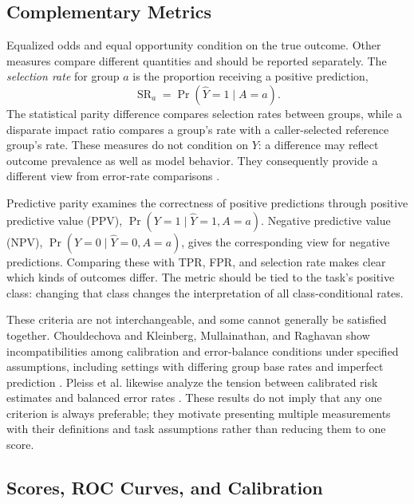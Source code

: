 \documentclass[12pt,a4paper]{article}
\begin{document}
\subsection{Complementary Metrics}

Equalized odds and equal opportunity condition on the true outcome. Other measures compare different quantities and should be reported separately. The \emph{selection rate} for group $a$ is the proportion receiving a positive prediction,
\begin{equation}
    \operatorname{SR}_a=\Pr(\widehat{Y}=1\mid A=a).
    \label{eq:selection-rate}
\end{equation}
The statistical parity difference compares selection rates between groups, while a disparate impact ratio compares a group's rate with a caller-selected reference group's rate. These measures do not condition on $Y$: a difference may reflect outcome prevalence as well as model behavior. They consequently provide a different view from error-rate comparisons \cite{hardt2016,verma2018}.

Predictive parity examines the correctness of positive predictions through positive predictive value (PPV), $\Pr(Y=1\mid\widehat{Y}=1,A=a)$. Negative predictive value (NPV), $\Pr(Y=0\mid\widehat{Y}=0,A=a)$, gives the corresponding view for negative predictions. Comparing these with TPR, FPR, and selection rate makes clear which kinds of outcomes differ. The metric should be tied to the task's positive class: changing that class changes the interpretation of all class-conditional rates.

These criteria are not interchangeable, and some cannot generally be satisfied together. Chouldechova and Kleinberg, Mullainathan, and Raghavan show incompatibilities among calibration and error-balance conditions under specified assumptions, including settings with differing group base rates and imperfect prediction \cite{chouldechova2017,kleinberg2017}. Pleiss et al. likewise analyze the tension between calibrated risk estimates and balanced error rates \cite{pleiss2017}. These results do not imply that any one criterion is always preferable; they motivate presenting multiple measurements with their definitions and task assumptions rather than reducing them to one score.

\subsection{Scores, ROC Curves, and Calibration}
\end{document}
